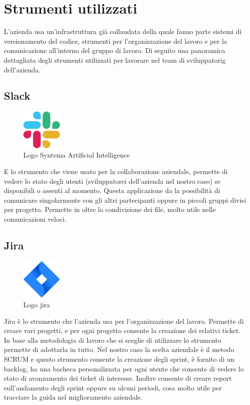 \section{Strumenti utilizzati}
L'azienda usa un'infrastruttura già collaudata della quale fanno parte sistemi di versionamento del codice, strumenti per l'organizzazione del lavoro e per la comunicazione all'interno del gruppo di lavoro.
Di seguito una panoramica dettagliata degli strumenti utilizzati per lavorare nel \gls{team di sviluppatorig} dell'azienda.

\subsection*{Slack}
\begin{figure}[H]
  \centering
  \includegraphics[width=2cm]{immagini/logo-Slack.jpg}
  \caption{Logo Syntema Artificial Intelligence}
\end{figure}
E lo strumento che viene usato per la collaborazione aziendale, permette di vedere lo stato degli utenti (sviluppatorei dell'azienda
nel nostro caso) se disponibili o assenti al momento. Questa applicazione da la possibilità di comunicare singolarmente con gli altri
partecipanti oppure in piccoli gruppi divisi per progetto. Permette in oltre la condivisione dei file, molto utile nelle
comunicazioni veloci.

\subsection*{Jira}
\begin{figure}[H]
  \centering
  \includegraphics[width=2cm]{immagini/logo-jira.jpg}
  \caption{Logo jira}
\end{figure}
Jira è lo strumento che l'azienda usa per l'organizzazione del lavoro. Permette di creare vari progetti, e per ogni progetto consente la
creazione dei relativi ticket. In base alla metodologia di lavoro che si sceglie di utilizzare lo strumento permette di adottarla in tutto.
Nel nostro caso la scelta aziendale è il metodo \gls{SCRUM} e questo strumento consente la creazione degli sprint, è fornito di un backlog, ha
una bacheca personalizzata per ogni utente che consente di vedere lo stato di avanzamento dei ticket di interesse. Inoltre consente di creare
report sull'andamento degli sprint oppure su alcuni periodi, cosa molto utile per tracciare la guida nel miglioramento aziendale.

